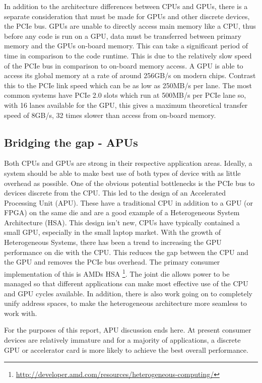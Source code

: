 In addition to the architecture differences between CPUs and GPUs, there is a
separate consideration that must be made for GPUs and other discrete devices,
the PCIe bus. GPUs are unable to directly access main memory like a CPU, thus
before any code is run on a GPU, data must be transferred between primary memory
and the GPUs on-board memory. This can take a significant period of time in
comparison to the code runtime. This is due to the relatively slow speed of the
PCIe bus in comparison to on-board memory access. A GPU is able to access its
global memory at a rate of around 256GB/s on modern chips. Contrast this to the
PCIe link speed which can be as low as 250MB/s per lane. The most common systems
have PCIe 2.0 slots which run at 500MB/s per PCIe lane so, with 16 lanes
available for the GPU, this gives a maximum theoretical transfer speed of 8GB/s,
32 times slower than access from on-board memory.

\subsection{Bridging the gap - APUs}

Both CPUs and GPUs are strong in their respective application areas. Ideally, a
system should be able to make best use of both types of device with as little
overhead as possible. One of the obvious potential bottlenecks is the PCIe bus
to devices discrete from the CPU. This led to the design of an Accelerated
Processing Unit (APU). These have a traditional CPU in addition to a GPU (or
FPGA) on the same die and are a good example of a Heterogeneous System
Architecture (HSA). This design isn't new, CPUs have typically contained a small
GPU, especially in the small laptop market. With the growth of Heterogeneous
Systems, there has been a trend to increasing the GPU performance on die with
the CPU. This reduces the gap between the CPU and the GPU and removes the PCIe
bus overhead. The primary consumer implementation of this is AMDs HSA
\footnote{\url{http://developer.amd.com/resources/heterogeneous-computing/}}.
The joint die allows power to be managed so that different applications can make
most effective use of the CPU and GPU cycles available. In addition, there is
also work going on to completely unify address spaces, to make the heterogeneous
architecture more seamless to work with.

For the purposes of this report, APU discussion ends here. At present consumer
devices are relatively immature and for a majority of applications, a discrete
GPU or accelerator card is more likely to achieve the best overall performance.

